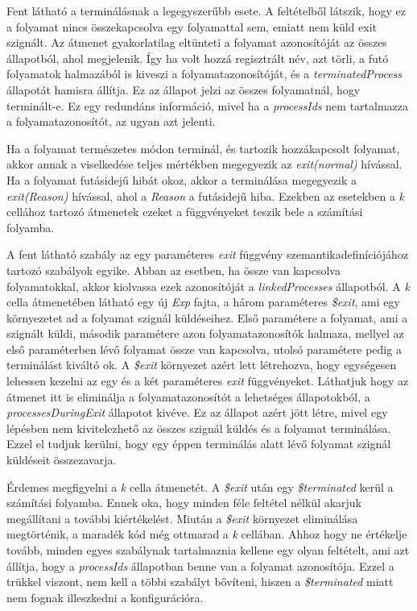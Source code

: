 

Fent látható a terminálásnak a legegyszerűbb esete. A feltételből látszik, hogy ez a folyamat nincs összekapcsolva egy folyamattal sem, emiatt nem küld exit szignált. Az átmenet gyakorlatilag eltünteti a folyamat azonosítóját az összes állapotból, ahol megjelenik. Így ha volt hozzá regisztrált név, azt törli, a futó folyamatok halmazából is kiveszi a folyamatazonosítóját, és a \textit{terminatedProcess} állapotát hamisra állítja. Ez az állapot jelzi az összes folyamatnál, hogy terminált-e. Ez egy redundáns információ, mivel ha a \textit{processIds} nem tartalmazza a folyamatazonosítót, az ugyan azt jelenti.

Ha a folyamat természetes módon terminál, és tartozik hozzákapcsolt folyamat, akkor annak a viselkedése teljes mértékben megegyezik az \textit{exit(normal)} hívással. Ha a folyamat futásidejű hibát okoz, akkor a terminálása megegyezik a \textit{exit(Reason)} hívással, ahol a \textit{Reason} a futásidejű hiba. Ezekben az esetekben a \textit{k} cellához tartozó átmenetek ezeket a függvényeket teszik bele a számítási folyamba.



A fent látható szabály az egy paraméteres \textit{exit} függvény szemantikadefiníciójához tartozó szabályok egyike. Abban az esetben, ha össze van kapcsolva folyamatokkal, akkor kiolvassa ezek azonosítóját a \textit{linkedProcesses} állapotból. A \textit{k} cella átmenetében látható egy új \textit{Exp} fajta, a három paraméteres \textit{\$exit}, ami egy környezetet ad a folyamat szignál küldéseihez. Első paramétere a folyamat, ami a szignált küldi, második paramétere azon folyamatazonosítók halmaza, mellyel az első paraméterben lévő folyamat össze van kapcsolva, utolsó paramétere pedig a terminálást kiváltó ok. A \textit{\$exit} környezet azért lett létrehozva, hogy egységesen lehessen kezelni az egy és a két paraméteres \textit{exit} függvényeket. Láthatjuk hogy az átmenet itt is eliminálja a folyamatazonosítót a lehetséges állapotokból, a \textit{processesDuringExit} állapotot kivéve. Ez az állapot azért jött létre, mivel egy lépésben nem kivitelezhető az összes szignál küldés és a folyamat terminálása. Ezzel el tudjuk kerülni, hogy egy éppen terminálás alatt lévő folyamat szignál küldéseit összezavarja.

Érdemes megfigyelni a \textit{k} cella átmenetét. A \textit{\$exit} után egy \textit{\$terminated} kerül a számítási folyamba. Ennek oka, hogy minden féle feltétel nélkül akarjuk megállítani a további kiértékelést. Miután a \textit{\$exit} környezet eliminálása megtörténik, a maradék kód még ottmarad a \textit{k} cellában. Ahhoz hogy ne értékelje tovább, minden egyes szabálynak tartalmaznia kellene egy olyan feltételt, ami azt állítja, hogy a \textit{processIds} állapotban benne van a folyamat azonosítója. Ezzel a trükkel viszont, nem kell a többi szabályt bővíteni, hiszen a \textit{\$terminated} miatt nem fognak illeszkedni a konfigurációra.

